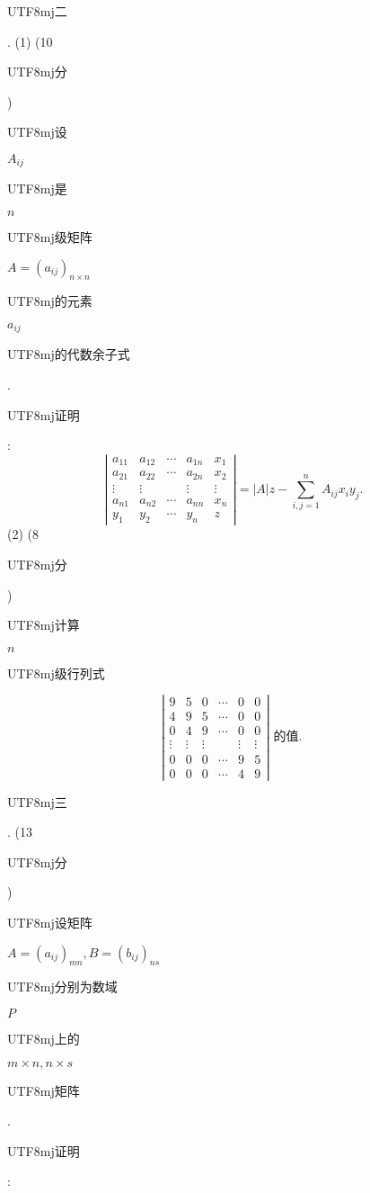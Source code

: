 \documentclass[10pt]{article}
\begin{document}
\begin{CJK}{UTF8}{mj}二\end{CJK}. (1) (10 \begin{CJK}{UTF8}{mj}分\end{CJK})\begin{CJK}{UTF8}{mj}设\end{CJK} $A_{i j}$ \begin{CJK}{UTF8}{mj}是\end{CJK} $n$ \begin{CJK}{UTF8}{mj}级矩阵\end{CJK} $A=\left(a_{i j}\right)_{n \times n}$ \begin{CJK}{UTF8}{mj}的元素\end{CJK} $a_{i j}$ \begin{CJK}{UTF8}{mj}的代数余子式\end{CJK}. \begin{CJK}{UTF8}{mj}证明\end{CJK}:
$$
\left|\begin{array}{ccccc}
a_{11} & a_{12} & \cdots & a_{1 n} & x_{1} \\
a_{21} & a_{22} & \cdots & a_{2 n} & x_{2} \\
\vdots & \vdots & & \vdots & \vdots \\
a_{n 1} & a_{n 2} & \cdots & a_{n n} & x_{n} \\
y_{1} & y_{2} & \cdots & y_{n} & z
\end{array}\right|=|A| z-\sum_{i, j=1}^{n} A_{i j} x_{i} y_{j} .
$$
(2) (8 \begin{CJK}{UTF8}{mj}分\end{CJK}) \begin{CJK}{UTF8}{mj}计算\end{CJK} $n$ \begin{CJK}{UTF8}{mj}级行列式\end{CJK}
$$
\left|\begin{array}{cccccc}
9 & 5 & 0 & \cdots & 0 & 0 \\
4 & 9 & 5 & \cdots & 0 & 0 \\
0 & 4 & 9 & \cdots & 0 & 0 \\
\vdots & \vdots & \vdots & & \vdots & \vdots \\
0 & 0 & 0 & \cdots & 9 & 5 \\
0 & 0 & 0 & \cdots & 4 & 9
\end{array}\right| \text { 的值. }
$$
\begin{CJK}{UTF8}{mj}三\end{CJK}. (13 \begin{CJK}{UTF8}{mj}分\end{CJK}) \begin{CJK}{UTF8}{mj}设矩阵\end{CJK} $A=\left(a_{i j}\right)_{m n}, B=\left(b_{i j}\right)_{n s}$ \begin{CJK}{UTF8}{mj}分别为数域\end{CJK} $P$ \begin{CJK}{UTF8}{mj}上的\end{CJK} $m \times n, n \times s$ \begin{CJK}{UTF8}{mj}矩阵\end{CJK}. \begin{CJK}{UTF8}{mj}证明\end{CJK}:
\end{document}
